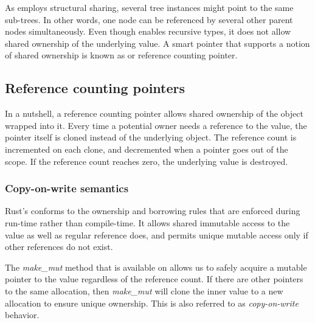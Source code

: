 As \rrbtree{} employs structural sharing, several tree instances might point to the same sub-trees. In other words, one node can be referenced by several other parent nodes simultaneously. Even though \boxptr{} enables recursive types, it does not allow shared ownership of the underlying value. A smart pointer that supports a notion of shared ownership is known as \rc{} or reference counting pointer.

\subsection{Reference counting pointers}
In a nutshell, a reference counting pointer allows shared ownership of the object wrapped into it. Every time a potential owner needs a reference to the value, the pointer itself is cloned instead of the underlying object. The reference count is incremented on each clone, and decremented when a pointer goes out of the scope. If the reference count reaches zero, the underlying value is destroyed.

\subsubsection*{Copy-on-write semantics}
Rust’s \rc{} conforms to the ownership and borrowing rules that are enforced during run-time rather than compile-time. It allows shared immutable access to the value as well as regular reference does, and permits unique mutable access only if other references do not exist. 

The \emph{make\_mut} method that is available on \rc{} allows us to safely acquire a mutable pointer to the value regardless of the reference count. If there are other pointers to the same allocation, then \emph{make\_mut} will clone the inner value to a new allocation to ensure unique ownership. This is also referred to as \emph{copy-on-write} behavior. 



